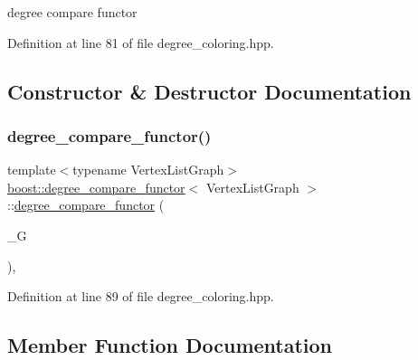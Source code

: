 degree compare functor 

Definition at line 81 of file degree\+\_\+coloring.\+hpp.



\subsection{Constructor \& Destructor Documentation}
\mbox{\label{structboost_1_1degree__compare__functor_ad9e59df87abfd40629e25185aff580b2}} 
\subsubsection{\texorpdfstring{degree\+\_\+compare\+\_\+functor()}{degree\_compare\_functor()}}
{\footnotesize\ttfamily template$<$typename Vertex\+List\+Graph$>$ \\
\hyperlink{structboost_1_1degree__compare__functor}{boost\+::degree\+\_\+compare\+\_\+functor}$<$ Vertex\+List\+Graph $>$\+::\hyperlink{structboost_1_1degree__compare__functor}{degree\+\_\+compare\+\_\+functor} (\begin{DoxyParamCaption}\item[{const Vertex\+List\+Graph \&}]{\+\_\+G }\end{DoxyParamCaption})\hspace{0.3cm}{\ttfamily [inline]}, {\ttfamily [explicit]}}



Definition at line 89 of file degree\+\_\+coloring.\+hpp.



\subsection{Member Function Documentation}
\mbox{\label{structboost_1_1degree__compare__functor_a206a1adfedbe3c8d8825f0936c77d3e5}} 
